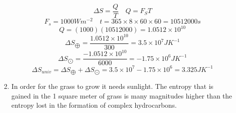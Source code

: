 \documentclass{article}
\begin{document}
\begin{enumerate}
\begin{enumerate}
                \[\Delta S = \frac{Q}{T} \quad Q = F_S T\]
                \[F_s = 1000 Wm^{-2} \quad t = 365 \times 8 \times 60 \times 60 = 10512000 s\]
                \[Q = (1000)(10512000) = 1.0512 \times 10^{10}\]
                \[\Delta S_{\bigoplus} = \frac{1.0512 \times 10^{10}}{300} = 3.5 \times 10^7 JK^{-1}\]
                \[\Delta S_{\bigodot} = \frac{-1.0512 \times 10^{10}}{6000} = -1.75 \times 10^6 JK^{-1}\]
                \[\Delta S_{univ} = \Delta S_{\bigoplus} + \Delta S_{\bigodot} = 3.5 \times 10^7 - 1.75 \times 10^6 = 3.325 JK^{-1}\]
            \item
                In order for the grass to grow it needs sunlight. The entropy that is gained in the 1 square meter of grass is many magnitudes higher than the entropy lost in the formation of complex hydrocarbons.
        \end{enumerate}
\end{enumerate}
\end{document}
